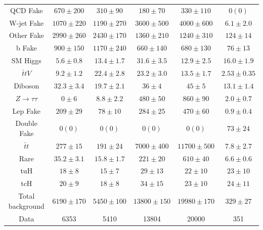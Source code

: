 \begin{table}[htbp]
\begin{tabular}{cccccc}
\hline
  QCD Fake               & $670 \pm 200  $& $310 \pm 90     $ & $180 \pm 70  $ & $330 \pm 110  $ & $0 (0)         $\\
  W-jet Fake             & $1070 \pm 220 $& $1190 \pm 270   $ & $3600 \pm 500$ & $4000 \pm 600 $ & $6.1 \pm 2.0   $\\
  Other Fake             & $2990 \pm 260 $& $2430 \pm 170   $ & $1360 \pm 210$ & $1240 \pm 310 $ & $124 \pm 14    $\\
  b Fake                 & $900 \pm 150  $& $1170 \pm 240   $ & $660 \pm 140 $ & $680 \pm 130  $ & $76 \pm 13     $\\
  SM Higgs               & $5.6 \pm 0.8  $& $13.4 \pm 1.7   $ & $31.6 \pm 3.5$ & $12.9 \pm 2.5 $ & $16.0 \pm 1.9  $ \\
  $\bar{t}tV$              & $9.2 \pm 1.2  $& $22.4 \pm 2.8   $ & $23.2 \pm 3.0$ & $13.5 \pm 1.7 $ & $2.53 \pm 0.35 $ \\
  Diboson                & $32.3 \pm 3.4 $& $19.7 \pm 2.1   $ & $36 \pm 4    $ & $45 \pm 5     $ & $13.1 \pm 1.4  $ \\
  $Z\rightarrow\tau\tau$   & $0 \pm 6      $& $8.8 \pm 2.2    $ & $480 \pm 50  $ & $860 \pm 90   $ & $2.0 \pm 0.7   $\\
  Lep Fake               & $209 \pm 29   $& $78 \pm 10      $ & $284 \pm 25  $ & $470 \pm 60   $ & $0.9 \pm 0.4   $\\
  Double Fake            & $0 (0)        $& $0 (0)          $ & $0 (0)       $ & $0 (0)        $ & $73 \pm 24     $\\
  $\bar{t}t$               & $277 \pm 15   $& $191 \pm 24     $ & $7000 \pm 400$ & $11700 \pm 500$ & $7.8 \pm 2.7   $\\
  Rare                   & $35.2 \pm 3.1 $& $15.8 \pm 1.7   $ & $221 \pm 20  $ & $610 \pm 40   $ & $6.6 \pm 0.6   $\\ \midrule
  tuH                    & $18 \pm 8     $& $15 \pm 7       $ & $29 \pm 13   $ & $22 \pm 10    $ & $23 \pm 10     $\\
  tcH                    & $20 \pm 9     $& $18 \pm 8       $ & $34 \pm 15   $ & $23 \pm 10    $ & $24 \pm 11     $\\
  Total background  & $6190 \pm 170$ & $5450 \pm 100$ & $13800 \pm 150$ & $19980 \pm 170$ & $329 \pm 27$ \\ \midrule
  Data   & 6353 & 5410 & 13804 & 20000 & 351 \\
\bottomrule\bottomrule
\end{tabular}\\



\end{table}
